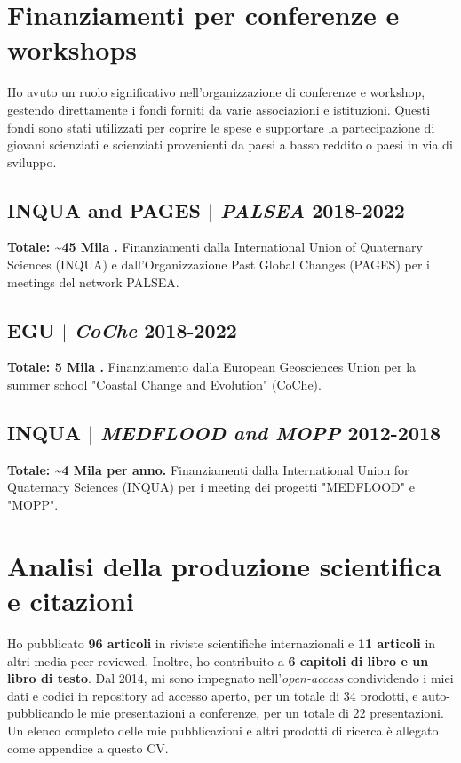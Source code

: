 \documentclass[11pt]{article}
\begin{document}
\section{Finanziamenti per conferenze e workshops}
{\normalfont Ho avuto un ruolo significativo nell'organizzazione di conferenze e workshop, gestendo direttamente i fondi forniti da varie associazioni e istituzioni. Questi fondi sono stati utilizzati per coprire le spese e supportare la partecipazione di giovani scienziati e scienziati provenienti da paesi a basso reddito o paesi in via di sviluppo.}\\

\bigskip

\subsection{INQUA and PAGES $|$ {\normalfont\textit{PALSEA}} \hfill 2018-2022}
{\footnotesize \textbf{Totale: \textasciitilde 45 Mila \texteuro.} Finanziamenti dalla International Union of Quaternary Sciences (INQUA) e dall'Organizzazione Past Global Changes (PAGES) per i meetings del network PALSEA.}
\bigskip

\subsection{EGU $|$ {\normalfont\textit{CoChe}} \hfill 2018-2022}
{\footnotesize \textbf{Totale: 5 Mila \texteuro.} Finanziamento dalla European Geosciences Union per la summer school "Coastal Change and Evolution" (CoChe).}
\bigskip

\subsection{INQUA $|$ {\normalfont\textit{MEDFLOOD and MOPP}} \hfill 2012-2018}
{\footnotesize \textbf{Totale: \textasciitilde 4 Mila \texteuro \space per anno.} Finanziamenti dalla International Union for Quaternary Sciences (INQUA) per i meeting dei progetti "MEDFLOOD" e "MOPP".}
\bigskip

\section{Analisi della produzione scientifica e citazioni}
\bigskip

{\normalfont Ho pubblicato \textbf{96 articoli} in riviste scientifiche internazionali e \textbf{11 articoli} in altri media peer-reviewed. Inoltre, ho contribuito a \textbf{6 capitoli di libro e un libro di testo}. Dal 2014, mi sono impegnato nell'\textit{open-access} condividendo i miei dati e codici in repository ad accesso aperto, per un totale di 34 prodotti, e auto-pubblicando le mie presentazioni a conferenze, per un totale di 22 presentazioni. Un elenco completo delle mie pubblicazioni e altri prodotti di ricerca è allegato come appendice a questo CV.}
\end{document}
